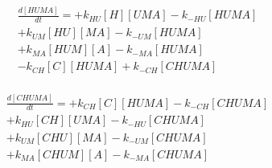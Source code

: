 \begin{equation}
\begin{split}
\frac{d[HUMA]}{dt} =  + k_{HU}[H][UMA] - k_{-HU}[HUMA]    \\%
                      + k_{UM}[HU][MA] - k_{-UM}[HUMA]    \\%
                      + k_{MA}[HUM][A] - k_{-MA}[HUMA]    \\%
                      - k_{CH}[C][HUMA] + k_{-CH}[CHUMA]  \\%
\end{split}
\end{equation}

\begin{equation}
\begin{split}
\frac{d[CHUMA]}{dt} = + k_{CH}[C][HUMA] - k_{-CH}[CHUMA]  \\%
                      + k_{HU}[CH][UMA] - k_{-HU}[CHUMA]  \\%
                      + k_{UM}[CHU][MA] - k_{-UM}[CHUMA]  \\%
                      + k_{MA}[CHUM][A] - k_{-MA}[CHUMA]  \\%
\end{split}
\end{equation}
